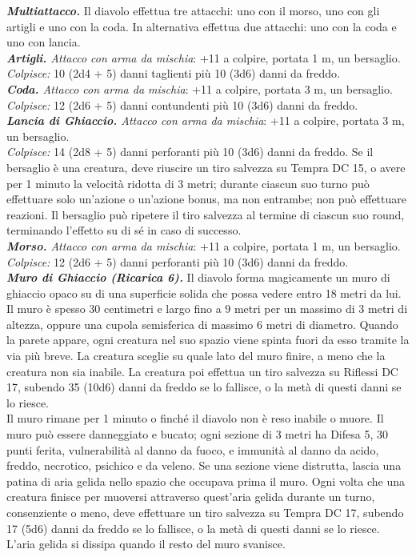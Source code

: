 \begin{multicols}{2}
\emph{\textbf{Multiattacco.}} Il diavolo effettua tre attacchi: uno con
il morso, uno con gli artigli e uno con la coda. In alternativa effettua due attacchi: uno con la coda e uno con lancia.\\
\emph{\textbf{Artigli.} Attacco con arma da mischia}: +11 a colpire, portata 1 m, un bersaglio.\\
\emph{Colpisce:} 10 (2d4 + 5) danni taglienti più 10 (3d6) danni da freddo.\\
\emph{\textbf{Coda.} Attacco con arma da mischia}: +11 a colpire, portata 3 m, un bersaglio.\\
\emph{Colpisce:} 12 (2d6 + 5) danni contundenti più 10 (3d6) danni da freddo.\\
\emph{\textbf{Lancia di Ghiaccio.} Attacco con arma da mischia}: +11 a colpire, portata 3 m, un bersaglio.\\
\emph{Colpisce:} 14 (2d8 + 5) danni perforanti più 10 (3d6) danni da freddo. Se il bersaglio è una creatura, deve riuscire un tiro salvezza su Tempra DC 15, o avere per 1 minuto la velocità ridotta di 3 metri; durante ciascun suo turno può effettuare solo un'azione o un'azione bonus, ma non entrambe; non può effettuare reazioni. Il bersaglio può ripetere il tiro salvezza al termine di ciascun suo round, terminando l'effetto su di sé in caso di successo.\\
\emph{\textbf{Morso.} Attacco con arma da mischia}: +11 a colpire, portata 1 m, un bersaglio.\\
\emph{Colpisce:} 12 (2d6 + 5) danni perforanti più 10 (3d6) danni da freddo.\\
\emph{\textbf{Muro di Ghiaccio (Ricarica 6).}} Il diavolo forma magicamente un muro di ghiaccio opaco su di una superficie solida che possa vedere entro 18 metri da lui. Il muro è spesso 30 centimetri e largo fino a 9 metri per un massimo di 3 metri di altezza, oppure una cupola semisferica di massimo 6 metri di diametro. Quando la parete appare, ogni creatura nel suo spazio viene spinta fuori da esso tramite la via più breve. La creatura sceglie su quale lato del muro finire, a meno che la creatura non sia inabile. La creatura poi effettua un tiro salvezza su Riflessi DC 17, subendo 35 (10d6) danni da freddo se lo fallisce, o la metà di questi danni se lo riesce.\\
Il muro rimane per 1 minuto o finché il diavolo non è reso inabile o muore. Il muro può essere danneggiato e bucato; ogni sezione di 3 metri ha Difesa 5, 30 punti ferita, vulnerabilità al danno da fuoco, e immunità al danno da acido, freddo, necrotico, psichico e da veleno. Se una sezione viene distrutta, lascia una patina di aria gelida nello spazio che occupava prima il muro. Ogni volta che una creatura finisce per muoversi attraverso quest'aria gelida durante un turno, consenziente o meno, deve effettuare un tiro salvezza su Tempra DC 17, subendo 17 (5d6) danni da freddo se lo fallisce, o la metà di questi danni se lo riesce. \\
L'aria gelida si dissipa quando il resto del muro svanisce.\\



\end{multicols}
